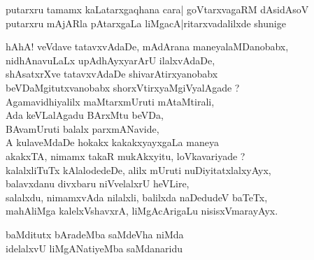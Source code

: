 \begin{entry}
\begin{shl}
putarxru tamamx kaLatarxgaqhana cara| goVtarxvagaRM dAsidAsoV\\
putarxru mAjARla pAtarxgaLa liMgacA|ritarxvadalilxde shunige
\end{shl}
\begin{shl}
hAhA! veVdave tatavxvAdaDe, mAdArana maneyalaMDanobabx,\\
nidhAnavuLaLx upAdhAyxyarArU ilalxvAdaDe,\\
shAsatxrXve tatavxvAdaDe shivarAtirxyanobabx\\
beVDaMgitutxvanobabx shorxVtirxyaMgiVyalAgade ?\\
Agamavidhiyalilx maMtarxmUruti mAtaMtirali,\\
Ada keVLalAgadu BArxMtu beVDa,\\
BAvamUruti balalx parxmANavide,\\
A kulaveMdaDe hokakx kakakxyayxgaLa maneya\\
akakxTA, nimamx takaR mukAkxyitu, loVkavariyade ?\\
kalalxliTuTx kAlalodedeDe, alilx mUruti nuDiyitatxlalxyAyx,\\
balavxdanu divxbaru niVvelalxrU heVLire,\\
salalxdu, nimamxvAda nilalxli, balilxda naDedudeV baTeTx,\\
mahAliMga kalelxVshavxrA, liMgAcArigaLu nisisxVmarayAyx.
\end{shl}
\end{entry}

\begin{entry}
\gl{}
\begin{shl}
baMditutx bAradeMba saMdeVha niMda\\
idelalxvU liMgANatiyeMba saMdanaridu
\end{shl}
\end{entry}

\begin{entry}
\end{entry}

